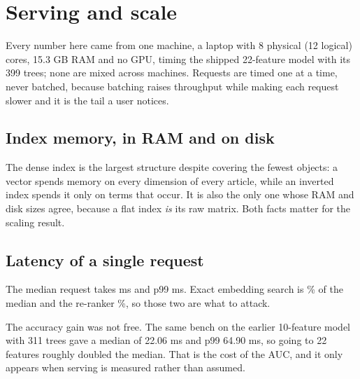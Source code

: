\section{Serving and scale}
\label{sec:serving}

Every number here came from one machine, a laptop with 8 physical (12 logical) cores, 15.3 GB RAM
and no GPU, timing the shipped 22-feature model with its 399 trees; none are mixed across machines.
Requests are timed one at a time, never batched, because batching raises throughput while
making each request slower and it is the tail a user notices.

\subsection{Index memory, in RAM and on disk}

\begin{table}[t]
\centering\footnotesize

\caption{Footprints measured separately in memory and serialised, since the two differ by
different factors per structure.}
\label{tab:footprint}
\end{table}

The dense index is the largest structure despite covering the fewest objects: a vector spends
memory on every dimension of every article, while an inverted index spends it only on terms that
occur. It is also the only one whose RAM and disk sizes agree, because a flat index \emph{is} its
raw matrix. Both facts matter for the scaling result.

\subsection{Latency of a single request}

\begin{table}[t]
\centering\footnotesize

\caption{End-to-end latency over \BenchRequests{} single requests on \eb{} small, stage by stage.}
\label{tab:latency}
\end{table}

The median request takes \BenchPfifty{} ms and p99 \BenchPninetynine{} ms. Exact embedding search
is \BenchAnnShare\% of the median and the re-ranker \BenchRerankShare\%, so those two are what to
attack.

The accuracy gain was not free. The same bench on the earlier 10-feature model with 311 trees gave a median of 22.06 ms and p99 64.90 ms, so going to 22 features roughly doubled the
median. That is the cost of the \EBGainTest{} AUC, and it only appears when serving is measured
rather than assumed.

